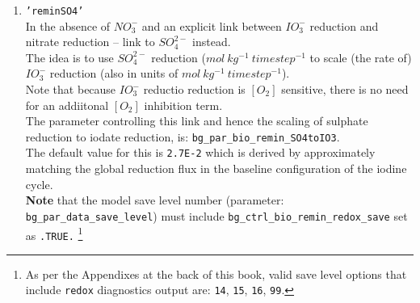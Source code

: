 \begin{itemize}[noitemsep]
\begin{enumerate}[noitemsep]
\vspace{1mm}
\item \texttt{'reminSO4'}
\vspace{1mm}
\\In the absence of \(NO^{-}_{3}\) and an explicit link between \(IO^{-}_{3}\) reduction and nitrate reduction -- link to \(SO^{2-}_{4}\) instead.
\\The idea is to use \(SO^{2-}_{4}\) reduction (\(mol\:kg^{-1}\:timestep^{-1}\) to scale (the rate of) \(IO^{-}_{3}\) reduction (also in units of \(mol\:kg^{-1}\:timestep^{-1}\)).
\\Note that because \(IO^{-}_{3}\) reductio reduction is \([O_{2}]\) sensitive, there is no need for an addiitonal \([O_{2}]\) inhibition term.
\vspace{1mm}
\\The parameter controlling this link and hence the scaling of sulphate reduction to iodate reduction, is: \texttt{bg\_par\_bio\_remin\_SO4toIO3}.
\vspace{1mm}
\\The default value for this is \texttt{2.7E-2} which is derived by approximately matching the global reduction flux in the baseline configuration of the iodine cycle.
\vspace{1mm}
\\\textbf{Note} that the model save level number (parameter: \texttt{bg\_par\_data\_save\_level}) must include \texttt{bg\_ctrl\_bio\_remin\_redox\_save} set as \texttt{.TRUE.} \footnote{As per the Appendixes at the back of this book, valid save level options that include \texttt{redox} diagnostics output are: \texttt{14}, \texttt{15}, \texttt{16}, \texttt{99}.}


\end{enumerate}
\end{itemize}
